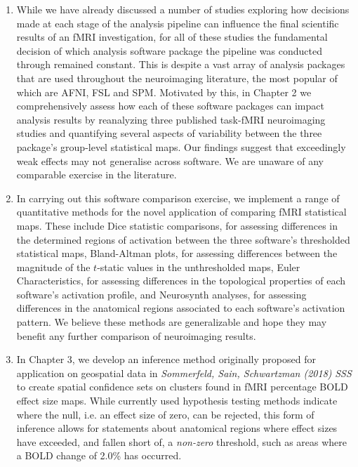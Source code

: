 \begin{enumerate}

\item While we have already discussed a number of studies exploring how decisions made at each stage of the analysis pipeline can influence the final scientific results of an fMRI investigation, for all of these studies the fundamental decision of which analysis software package the pipeline was conducted through remained constant. This is despite a vast array of analysis packages that are used throughout the neuroimaging literature, the most popular of which are AFNI, FSL and SPM. Motivated by this, in Chapter 2 we comprehensively assess how each of these software packages can impact analysis results by reanalyzing three published task-fMRI neuroimaging studies and quantifying several aspects of variability between the three package's group-level statistical maps. Our findings suggest that exceedingly weak effects may not generalise across software. We are unaware of any comparable exercise in the literature.  

\item In carrying out this software comparison exercise, we implement a range of quantitative methods for the novel application of comparing fMRI statistical maps. These include Dice statistic comparisons, for assessing differences in the determined regions of activation between the three software's thresholded statistical maps, Bland-Altman plots, for assessing differences between the magnitude of the $t$-static values in the unthresholded maps, Euler Characteristics, for assessing differences in the topological properties of each software's activation profile, and Neurosynth analyses, for assessing differences in the anatomical regions associated to each software's activation pattern. We believe these methods are generalizable and hope they may benefit any further comparison of neuroimaging results. 

\item In Chapter 3, we develop an inference method originally proposed for application on geospatial data in \textit{Sommerfeld, Sain, Schwartzman (2018)} \textit{SSS} to create spatial confidence sets on clusters found in fMRI percentage BOLD effect size maps. While currently used hypothesis testing methods indicate where the null, i.e. an effect size of zero, can be rejected, this form of inference allows for statements about anatomical regions where effect sizes have exceeded, and fallen short of, a \textit{non-zero} threshold, such as areas where a BOLD change of 2.0\% has occurred. 


\end{enumerate}

